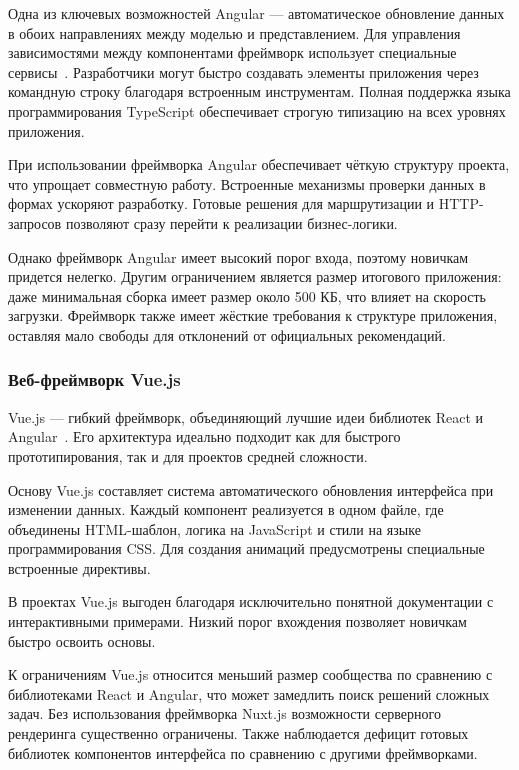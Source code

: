 Одна из ключевых возможностей Angular --- автоматическое обновление данных в обоих направлениях между моделью и представлением. Для управления зависимостями между компонентами фреймворк использует специальные сервисы~\cite{angular_dependency_injection}. Разработчики могут быстро создавать элементы приложения через командную строку благодаря встроенным инструментам. Полная поддержка языка программирования TypeScript обеспечивает строгую типизацию на всех уровнях приложения.

При использовании фреймворка Angular обеспечивает чёткую структуру проекта, что упрощает совместную работу. Встроенные механизмы проверки данных в формах ускоряют разработку. Готовые решения для маршрутизации и HTTP-запросов позволяют сразу перейти к реализации бизнес-логики.

Однако фреймворк Angular имеет высокий порог входа, поэтому новичкам придется нелегко. Другим ограничением является размер итогового приложения: даже минимальная сборка имеет размер около 500 КБ, что влияет на скорость загрузки. Фреймворк также имеет жёсткие требования к структуре приложения, оставляя мало свободы для отклонений от официальных рекомендаций.

\subsubsection{Веб-фреймворк Vue.js}
Vue.js --- гибкий фреймворк, объединяющий лучшие идеи библиотек React и Angular~\cite{vuejs_guide}. Его архитектура идеально подходит как для быстрого прототипирования, так и для проектов средней сложности.

Основу Vue.js составляет система автоматического обновления интерфейса при изменении данных. Каждый компонент реализуется в одном файле, где объединены HTML-шаблон, логика на JavaScript и стили на языке программирования CSS. Для создания анимаций предусмотрены специальные встроенные директивы.

В проектах Vue.js выгоден благодаря исключительно понятной документации с интерактивными примерами. Низкий порог вхождения позволяет новичкам быстро освоить основы.

К ограничениям Vue.js относится меньший размер сообщества по сравнению с библиотеками React и Angular, что может замедлить поиск решений сложных задач. Без использования фреймворка Nuxt.js возможности серверного рендеринга существенно ограничены. Также наблюдается дефицит готовых библиотек компонентов интерфейса по сравнению с другими фреймворками.

